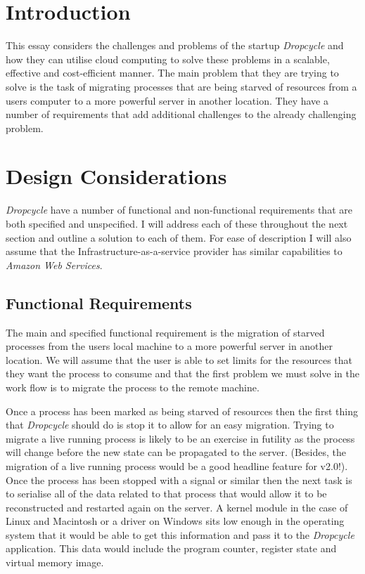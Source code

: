 \documentclass[12pt, a4paper]{article}
\title{\thetitle}
\author{\theauthor}
\date{\today}
\begin{document}
\maketitle
\thispagestyle{empty}

\section{Introduction}

This essay considers the challenges and problems of the startup
\emph{Dropcycle} and how they can utilise cloud computing to solve these
problems in a scalable, effective and cost-efficient manner. The main problem
that they are trying to solve is the task of migrating processes that are being
starved of resources from a users computer to a more powerful server in another
location. They have a number of requirements that add additional challenges to
the already challenging problem.

\section{Design Considerations}

\emph{Dropcycle} have a number of functional and non-functional requirements
that are both specified and unspecified. I will address each of these
throughout the next section and outline a solution to each of them. For ease of
description I will also assume that the Infrastructure-as-a-service provider
has similar capabilities to \emph{Amazon Web Services}.

\subsection{Functional Requirements}

The main and specified functional requirement is the migration of starved
processes from the users local machine to a more powerful server in another
location. We will assume that the user is able to set limits for the resources
that they want the process to consume and that the first problem we must solve
in the work flow is to migrate the process to the remote machine.

Once a process has been marked as being starved of resources then the first
thing that \emph{Dropcycle} should do is stop it to allow for an easy
migration. Trying to migrate a live running process is likely to be an exercise
in futility as the process will change before the new state can be propagated
to the server. (Besides, the migration of a live running process would be
a good headline feature for v2.0!). Once the process has been stopped with
a signal or similar then the next task is to serialise all of the data related
to that process that would allow it to be reconstructed and restarted again on
the server. A kernel module in the case of Linux and Macintosh or a driver on
Windows sits low enough in the operating system that it would be able to get
this information and pass it to the \emph{Dropcycle} application. This data
would include the program counter, register state and virtual memory image.
\end{document}
